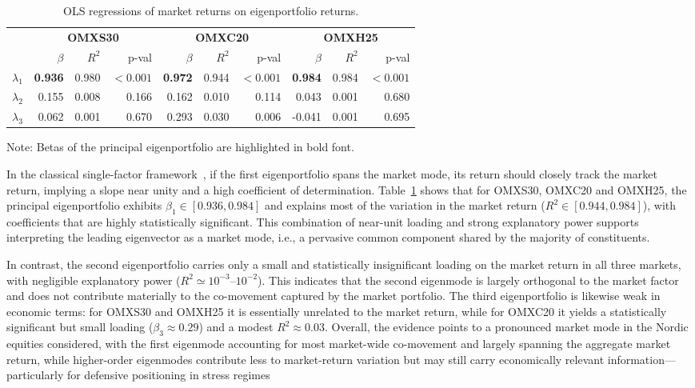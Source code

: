 \documentclass[pdflatex,sn-basic]{sn-jnl}%
\theoremstyle{thmstyleone}%
\theoremstyle{thmstyletwo}%
\theoremstyle{thmstylethree}%
\begin{document}
\begin{table}[t!]
\centering
\renewcommand{\arraystretch}{1.15}
\setlength{\tabcolsep}{6pt}
\caption{OLS regressions of market returns on eigenportfolio returns.}
\label{tab:nordic_eigenbeta}
\begin{tabular}{l rrr rrr rrr}
\hline
& \multicolumn{3}{c}{\textbf{OMXS30}} &
  \multicolumn{3}{c}{\textbf{OMXC20}} &
  \multicolumn{3}{c}{\textbf{OMXH25}} \\
\textbf{} &
{$\beta$} & {$R^2$} & {p-val} &
{$\beta$} & {$R^2$} & {p-val} &
{$\beta$} & {$R^2$} & {p-val} \\
\hline
$\lambda_1$ & \textbf{0.936} & 0.980 & \multicolumn{1}{r}{$<0.001$} &
    \textbf{0.972} & 0.944 & \multicolumn{1}{r}{$<0.001$} &
    \textbf{0.984} & 0.984 & \multicolumn{1}{r}{$<0.001$} \\
$\lambda_2$ & 0.155 & 0.008 & 0.166 &
    0.162 & 0.010 & 0.114 &
    0.043 & 0.001 & 0.680 \\
$\lambda_3$ & 0.062 & 0.001 & 0.670 &
    0.293 & 0.030 & 0.006 &
   -0.041 & 0.001 & 0.695 \\
\hline
\end{tabular}
Note: Betas of the principal eigenportfolio are highlighted in bold font.
\end{table}

In the classical single-factor framework~\citep{sharpe1964capital}, if the first eigenportfolio spans the market mode, its return should closely track the market return, implying a slope near unity and a high coefficient of determination. Table~\ref{tab:nordic_eigenbeta} shows that for OMXS30, OMXC20 and OMXH25, the principal eigenportfolio exhibits \(\beta_1\in[0.936,0.984]\) and explains most of the variation in the market return (\(R^2\in[0.944,0.984]\)), with coefficients that are highly statistically significant. This combination of near-unit loading and strong explanatory power supports interpreting the leading eigenvector as a market mode, i.e., a pervasive common component shared by the majority of constituents.

In contrast, the second eigenportfolio carries only a small and statistically insignificant loading on the market return in all three markets, with negligible explanatory power ($R^2 \simeq 10^{-3}$--$10^{-2}$). This indicates that the second eigenmode is largely orthogonal to the market factor and does not contribute materially to the co-movement captured by the market portfolio. The third eigenportfolio is likewise weak in economic terms: for OMXS30 and OMXH25 it is essentially unrelated to the market return, while for OMXC20 it yields a statistically significant but small loading ($\beta_3 \approx 0.29$) and a modest $R^2 \approx 0.03$. Overall, the evidence points to a pronounced market mode in the Nordic equities considered, with the first eigenmode accounting for most market-wide co-movement and largely spanning the aggregate market return, while higher-order eigenmodes contribute less to market-return variation but may still carry economically relevant information—particularly for defensive positioning in stress regimes
\end{document}
